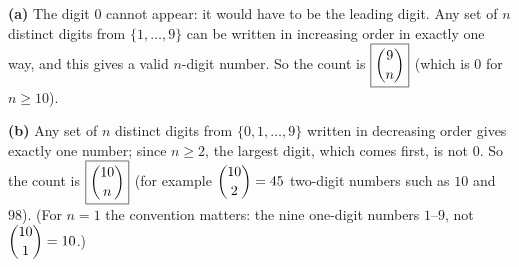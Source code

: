 \textbf{(a)} The digit $0$ cannot appear: it would have to be the leading digit. Any set of $n$ distinct digits from $\{1,\dots,9\}$ can be written in increasing order in exactly one way, and this gives a valid $n$-digit number. So the count is $\boxed{\dbinom9n}$ (which is $0$ for $n\ge10$).

\textbf{(b)} Any set of $n$ distinct digits from $\{0,1,\dots,9\}$ written in decreasing order gives exactly one number; since $n\ge2$, the largest digit, which comes first, is not $0$. So the count is $\boxed{\dbinom{10}{n}}$ (for example $\dbinom{10}{2}=45$ two-digit numbers such as $10$ and $98$). (For $n=1$ the convention matters: the nine one-digit numbers $1$--$9$, not $\dbinom{10}1=10$.)
